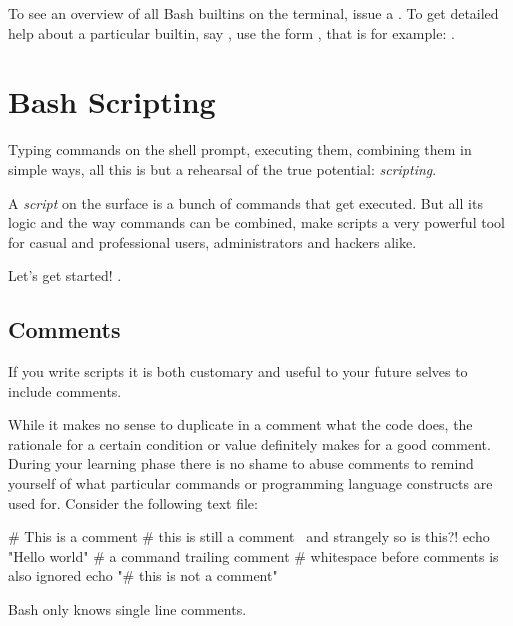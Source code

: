 \documentclass{olli-handout}
\begin{document}
To see an overview of all Bash builtins on the terminal, issue a . To get detailed help about a particular builtin, say , use the form , that is for example: .

\chapter{Bash Scripting}

Typing commands on the shell prompt, executing them, combining them in simple ways, all this is but a rehearsal of the true potential: \emph{scripting}.

A \emph{script} on the surface is a bunch of commands that get executed. But all its logic and the way commands can be combined, make scripts a very powerful tool for casual and professional users, administrators and hackers alike.

Let's get started! .

\section{Comments}

\begin{refmanbash}
\end{refmanbash}

If you write scripts it is both customary and useful to your future selves to include comments.

While it makes no sense to duplicate in a comment what the code does, the rationale for a certain condition or value definitely makes for a good comment. During your learning phase there is no shame to abuse comments to remind yourself of what particular commands or programming language constructs are used for. Consider the following text file:

\begin{lstbash}
# This is a comment
# this is still a comment \
and strangely so is this?!
echo "Hello world" # a command trailing comment
     # whitespace before comments is also ignored
echo "# this is not a comment"
\end{lstbash}

Bash only knows single line comments.
\end{document}
